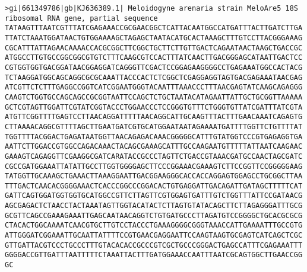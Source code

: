 \documentclass[11pt]{article}
\begin{document}
\begin{Verbatim}[commandchars=\\\{\}]
>gi|661349786|gb|KJ636389.1| Meloidogyne arenaria strain MeloAre5 18S ribosomal RNA gene, partial sequence
TATAAGTTTAATCGTTTATCGAGAAACCGCGAACGGCTCATTACAATGGCCATGATTTACTTGATCTTGA
TTATCTAAATGGATAACTGTGGAAAAGCTAGAGCTAATACATGCACTAAAGCTTTGTCCTTACGGGAAAG
CGCATTTATTAGAACAAAACCACGCGGCTTCGGCTGCTTCTTGTTGACTCAGAATAACTAAGCTGACCGC
ATGGCCTTGTGCCGGCGGCGTGTCTTTCAAGCGTCCACTTTATCAACTTGACGGGAGCATAATTGACTCC
CGTGGTGGTGACGGATAACGGAGGATCAGGGTTCGACTCCGGAGAAGGGGCCTGAGAAATGGCCACTACG
TCTAAGGATGGCAGCAGGCGCGCAAATTACCCACTCTCGGCTCGAGGAGGTAGTGACGAGAAATAACGAG
ATCGTTCTCTTTGAGGCCGGTCATCGGAATGGGTACAATTTAAACCCTTTAACGAGTATCAAGCAGAGGG
CAAGTCTGGTGCCAGCAGCCGCGGTAATTCCAGCTCTGCTAATACATAGAATTATTGCTGCGGTTAAAAA
GCTCGTAGTTGGATTCGTATCGGTACCCTGGAACCCTCCGGGTGTTTCTGGGTGTTATCGATTTATCGTA
ATGTTCGGTTTTGAGTCCTTAACAGGATTTTTAACAGGCATTGCAAGTTTACTTTGAACAAATCAGAGTG
CTTAAAACAGGCGTTTTAGCTTGAATGATCGTGCATGGAATAATAGAAAATGATTTTGGTTCTGTTTTAT
TGGTTTTACGGACTGAGATAATGGTTAACAGAGACAAACGGGGGCATTTGTATGGTCCCGTGAGAGGTGA
AATTCTTGGACCGTGGCCAGACAAACTACAGCGAAAGCATTTGCCAAGAATGTTTTTATTAATCAAGAAC
GAAAGTCAGAGGTTCGAAGGCGATCARATACCGCCCTAGTTCTGACCGTAAACGATGCCAACTAGCGATC
CGCCGATGGAAATTATATTGCCTTGGTGGGGAGCTTCCCGGAAACGAAAGTCTTCCGGTTCCGGGGGAAG
TATGGTTGCAAAGCTGAAACTTAAAGGAATTGACGGAAGGGCACCACCAGGAGTGGAGCCTGCGGCTTAA
TTTGACTCAACACGGGGAAACTCACCCGGCCCGGACACTGTGAGGATTGACAGATTGATAGCTTTTTCAT
GATTCAGTGGATGGTGGTGCATGGCCGTTCTTAGTTCGTGGAGTGATTTGTCTGGTTTATTCCGATAACG
AGCGAGACTCTAACCTACTAAATAGTTGGTACATACTCTTAGTGTATACAGCTTCTTAGAGGGATTTGCG
GCGTTCAGCCGAAAGAAATTGAGCAATAACAGGTCTGTGATGCCCTTAGATGTCCGGGGCTGCACGCGCG
CTACACTGGCAAAATCAACGTGCTTGTCCTACCCTGAAAGGGGCGGGTAAACCATTGAAAATTTGCCGTG
ATTGGGATCGGAAATTGCAATTATTTTCCGTGAACGAGGAATTCCAAGTAAGTGCGAGTCATCAGCTCGC
GTTGATTACGTCCCTGCCCTTTGTACACACCGCCCGTCGCTGCCCGGGACTGAGCCATTTCGAGAAATTT
GGGGACCGTTGATTTAATTTTTCTAAATTACTTTGATGGAAACCAATTTAATCGCAGTGGCTTGAACCGG
GC


\end{Verbatim}
\end{document}
